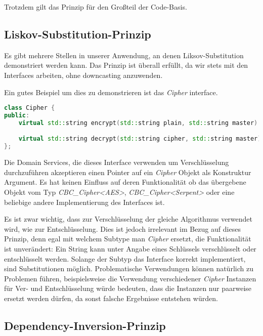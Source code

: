 Trotzdem gilt das Prinzip für den Großteil der Code-Basis.

\subsection{Liskov-Substitution-Prinzip}

Es gibt mehrere Stellen in unserer Anwendung, an denen Liksov-Substitution demonstriert werden kann. Das Prinzip ist überall erfüllt, da wir stets mit den Interfaces arbeiten, ohne downcasting anzuwenden.

Ein gutes Beispiel um dies zu demonstrieren ist das \textit{Cipher} interface.

\begin{lstlisting}[language=C++]
class Cipher {
public:
    virtual std::string encrypt(std::string plain, std::string master) const = 0;

    virtual std::string decrypt(std::string cipher, std::string master) const = 0;
};
\end{lstlisting}

Die Domain Services, die dieses Interface verwenden um Verschlüsselung durchzuführen akzeptieren einen Pointer auf ein \textit{Cipher} Objekt als Konstruktur Argument. Es hat keinen Einfluss auf deren Funktionalität ob das übergebene Objekt vom Typ \textit{CBC\_Cipher<AES>}, \textit{CBC\_Cipher<Serpent>} oder eine beliebige andere Implementierung des Interfaces ist.

Es ist zwar wichtig, dass zur Verschlüsselung der gleiche Algorithmus verwendet wird, wie zur Entschlüsselung. Dies ist jedoch irrelevant im Bezug auf dieses Prinzip, denn egal mit welchem Subtype man \textit{Cipher} ersetzt, die Funktionalität ist unverändert: Ein String kann unter Angabe eines Schlüssels verschlüsselt oder entschlüsselt werden. Solange der Subtyp das Interface korrekt implementiert, sind Substitutionen möglich.
Problematische Verwendungen können natürlich zu Problemen führen, beispielsweise die Verwendung verschiedener \textit{Cipher} Instanzen für Ver- und Entschlüsselung würde bedeuten, dass die Instanzen nur paarweise ersetzt werden dürfen, da sonst falsche Ergebnisse entstehen würden.

\subsection{Dependency-Inversion-Prinzip}

